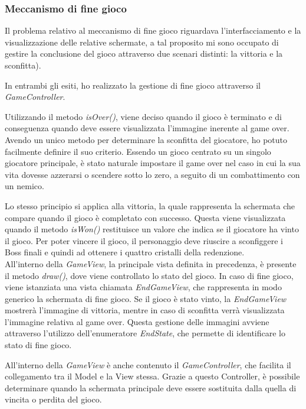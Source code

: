 \documentclass[a4paper,12pt]{report}
\begin{document}
\subsubsection{Meccanismo di fine gioco}
Il problema relativo al meccanismo di fine gioco riguardava l'interfacciamento e la visualizzazione delle relative schermate, a tal proposito mi sono occupato di gestire la conclusione del gioco attraverso due scenari distinti: la vittoria e la sconfitta).

In entrambi gli esiti, ho realizzato la gestione di fine gioco attraverso il \textit{GameController}. 

Utilizzando il metodo \textit{isOver()}, viene deciso quando il gioco è terminato e di conseguenza quando deve essere visualizzata l'immagine inerente al game over. Avendo un unico metodo per determinare la sconfitta del giocatore, ho potuto facilmente definire il suo criterio. Essendo un gioco centrato su un singolo giocatore principale, è stato naturale impostare il game over nel caso in cui la sua vita dovesse azzerarsi o scendere sotto lo zero, a seguito di un combattimento con un nemico. 

Lo stesso principio si applica alla vittoria, la quale rappresenta la schermata che compare quando il gioco è completato con successo. Questa viene visualizzata quando il metodo \textit{isWon()} restituisce un valore che indica se il giocatore ha vinto il gioco. Per poter vincere il gioco, il personaggio deve riuscire a sconfiggere i Boss finali e quindi ad ottenere i quattro cristalli della redenzione.\\

All'interno della \textit{GameView}, la principale vista definita in precedenza, è presente il metodo \textit{draw()}, dove viene controllato lo stato del gioco. In caso di fine gioco, viene istanziata una vista chiamata \textit{EndGameView}, che rappresenta in modo generico la schermata di fine gioco. Se il gioco è stato vinto, la \textit{EndGameView} mostrerà l'immagine di vittoria, mentre in caso di sconfitta verrà visualizzata l'immagine relativa al game over. Questa gestione delle immagini avviene attraverso l'utilizzo dell'enumeratore \textit{EndState}, che permette di identificare lo stato di fine gioco.

All'interno della \textit{GameView} è anche contenuto il \textit{GameController}, che facilita il collegamento tra il Model e la View stessa. Grazie a questo Controller, è possibile determinare quando la schermata principale deve essere sostituita dalla quella di vincita o perdita del gioco.
\end{document}
